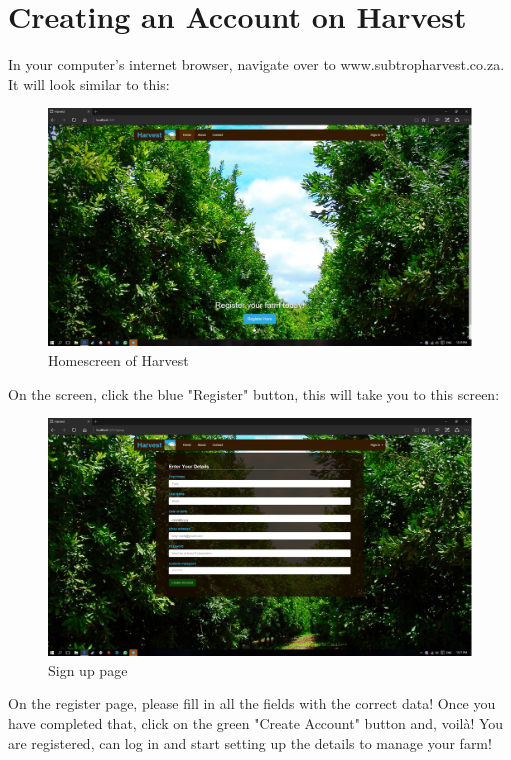 \documentclass[11pt,fleqn]{book} %
\begin{document}
	\section{Creating an Account on Harvest}
		In your computer's internet browser, navigate over to www.subtropharvest.co.za. It will look similar to this:
		\begin{figure}[H]
			\includegraphics[scale=0.25]{Pictures/homescreen.jpg}\centering
			\caption{Homescreen of Harvest}
		\end{figure}
		On the screen, click the blue "Register" button, this will take you to this screen:
		\begin{figure}[H]
			\includegraphics[scale=0.25]{Pictures/signup.jpg}\centering
			\caption{Sign up page}
		\end{figure}
		On the register page, please fill in all the fields with the correct data! Once you have completed that, click on the green "Create Account" button and, voilà! You are registered, can log in and start setting up the details to manage your farm!
		

\end{document}
